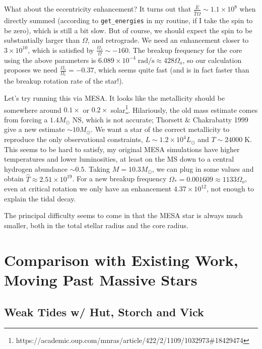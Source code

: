 \documentclass[11pt,
        usenames, %
        dvipsnames %
    ]{article}
\newcommand*{\scinot}[2]{#1\times10^{#2}}
\begin{document}
What about the eccentricity enhancement? It turns out that
$\frac{\dot{E}}{\hat{T}\Omega} \sim \scinot{1.1}{8}$ when directly summed
(according to \lstinline{get_energies} in my routine, if I take the spin to be
zero), which is still a bit slow. But of course, we should expect the spin to be
substantially larger than $\Omega$, and retrograde. We need an enhancement
closer to $\scinot{3}{10}$, which is satisfied by $\frac{\Omega_s}{\Omega} \sim
-160$. The breakup frequency for the core using the above parameters is
$\scinot{6.089}{-4}\;\mathrm{rad/s} \approx 428\Omega_o$, so our calculation
proposes we need $\frac{\Omega_s}{\Omega_c} = -0.37$, which seems quite fast
(and is in fact faster than the breakup rotation rate of the star!).

Let's try running this via MESA\@. It looks like the metallicity should be
somewhere around $0.1\times$ or $0.2\times$
solar\footnote{https://academic.oup.com/mnras/article/422/2/1109/1032973\#18429474}.
Hilariously, the old mass estimate comes from forcing a $1.4M_{\odot}$ NS, which
is not accurate; Thorsett \& Chakrabatty 1999 give a new estimate $\sim 10
M_{\odot}$. We want a star of the correct metallicity to reproduce the only
observational constraints, $L \sim \scinot{1.2}{4}L_{\odot}$ and $T \sim
24000\;\mathrm{K}$. This seems to be hard to satisfy, my original MESA
simulations have higher temperatures and lower luminosities, at least on the
MS down to a central hydrogen abundance $\sim 0.5$. Taking $M = 10.3M_{\odot}$,
we can plug in some values and obtain $\hat{T} \approx \scinot{2.51}{19}$. For a
new breakup frequency $\Omega_* = 0.001609 \approx 1133 \Omega_o$, even at
critical rotation we only have an enhancement $\scinot{4.37}{12}$, not enough to
explain the tidal decay.

The principal difficulty seems to come in that the MESA star is always much
smaller, both in the total stellar radius and the core radius.

\section{Comparison with Existing Work, Moving Past Massive Stars}

\subsection{Weak Tides w/ Hut, Storch and Vick}
\end{document}
